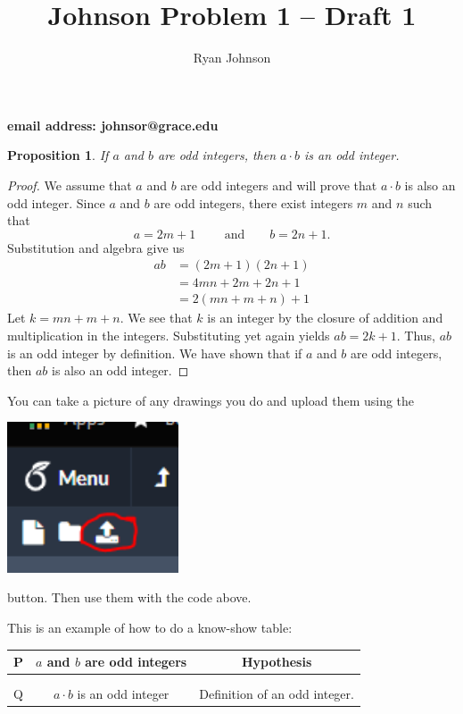 \documentclass[12pt]{article}
\title{Johnson Problem 1 -- Draft 1}
\author{Ryan Johnson}
\theoremstyle{plain}
\newtheorem{proposition}[theorem]{Proposition}
\begin{document}
\maketitle

\begin{center}
\textbf{email address: johnsor@grace.edu}
\end{center}

\begin{proposition}
If $a$ and $b$ are odd integers, then $a \cdot b$ is an odd integer.
\end{proposition}

\begin{proof}
We assume that $a$ and $b$ are odd integers and will prove that $a \cdot b$ is also an odd integer.  Since $a$ and $b$ are odd integers, there exist integers $m$ and $n$ such that
\[
a = 2m + 1 \text{ ~~~~~~and~~~~~ } b = 2n + 1.
\]
Substitution and algebra give us
\begin{align*}
ab &= (2m + 1)(2n + 1) \\
    &= 4mn + 2m + 2n + 1 \\
    &= 2(mn + m + n) + 1
\end{align*}
Let $k = mn + m + n$.  We see that $k$ is an integer by the closure of addition and multiplication in the integers.  Substituting yet again yields $ab = 2k+1$.  Thus, $ab$ is an odd integer by definition.  We have shown that if $a$ and $b$ are odd integers, then $ab$ is also an odd integer.
\end{proof}


\newpage

You can take a picture of any drawings you do and upload them using the 

\includegraphics[width=2in]{an_upload.png}

button.  Then use them with the code above.

\newpage

This is an example of how to do a know-show table:

\begin{tabular}{|c|c|c|}
    \hline
    P & $a$ and $b$ are odd integers & Hypothesis  \\ \hline
     & & \\ \hline
     & & \\ \hline
     Q & $a \cdot b$ is an odd integer & Definition of an odd integer. \\ \hline
\end{tabular}
\end{document}

